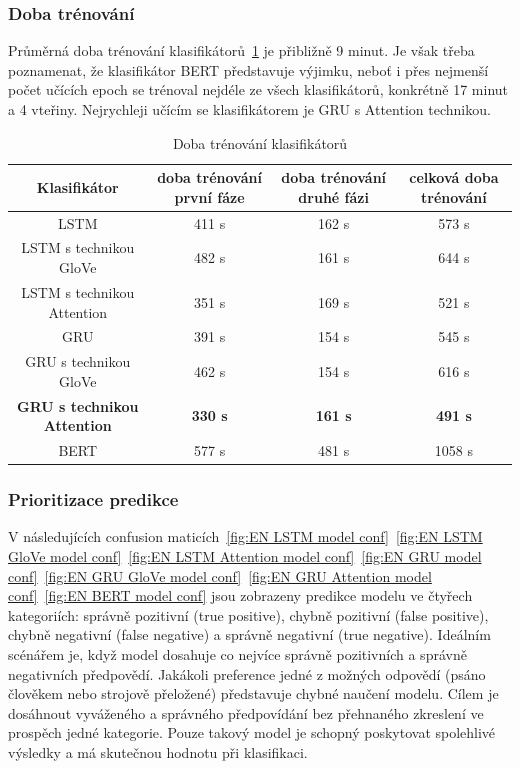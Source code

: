 \subsubsection{Doba trénování}
Průměrná doba trénování klasifikátorů~\ref{tab:EN doba trenovani} je přibližně 9 minut.
Je však třeba poznamenat, že klasifikátor BERT představuje výjimku, neboť i přes nejmenší počet učících epoch se trénoval nejdéle ze všech klasifikátorů, konkrétně 17 minut a 4 vteřiny.
Nejrychleji učícím se klasifikátorem je GRU s Attention technikou.

\begin{table}[H]
	\centering
	\caption{Doba trénování klasifikátorů}\label{tab:EN doba trenovani}
	\begin{tabular}{ c c c c }
			\toprule
			Klasifikátor & doba trénování první fáze & doba trénování druhé fázi & celková doba trénování\\
			\midrule
            LSTM & 411 s & 162 s & 573 s\\
            LSTM s technikou GloVe & 482 s & 161 s & 644 s\\
            LSTM s technikou Attention & 351 s & 169 s & 521 s\\
            GRU & 391 s & 154 s & 545 s\\
            GRU s technikou GloVe & 462 s & 154 s & 616 s\\
            \textbf{GRU s technikou Attention} & \textbf{330 s} & \textbf{161 s} & \textbf{491 s}\\
            BERT & 577 s & 481 s & 1058 s\\
			\midrule
		\end{tabular}
\end{table}

\subsubsection{Prioritizace predikce}
V následujících confusion maticích~\ref{fig:EN LSTM model conf}~\ref{fig:EN LSTM GloVe model conf}~\ref{fig:EN LSTM Attention model conf}~\ref{fig:EN GRU model conf}~\ref{fig:EN GRU GloVe model conf}~\ref{fig:EN GRU Attention model conf}~\ref{fig:EN BERT model conf} jsou zobrazeny predikce modelu ve čtyřech kategoriích: správně pozitivní (true positive), chybně pozitivní (false positive), chybně negativní (false negative) a správně negativní (true negative).
Ideálním scénářem je, když model dosahuje co nejvíce správně pozitivních a správně negativních předpovědí.
Jakákoli preference jedné z možných odpovědí (psáno člověkem nebo strojově přeložené) představuje chybné naučení modelu.
Cílem je dosáhnout vyváženého a správného předpovídání bez přehnaného zkreslení ve prospěch jedné kategorie.
Pouze takový model je schopný poskytovat spolehlivé výsledky a má skutečnou hodnotu při klasifikaci.

